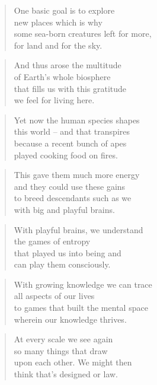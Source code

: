 \documentclass[10pt,a4paper]{article}
\begin{document}
\begin{multicols}{2}
\begin{verse}
One basic goal is to explore\\
new places which is why\\
some sea-born creatures left for more,\\
for land and for the sky.
\end{verse}

\begin{verse}
And thus arose the multitude\\
of Earth’s whole biosphere\\
that fills us with this gratitude\\
we feel for living here.
\end{verse}

\begin{verse}
Yet now the human species shapes\\
this world – and that transpires\\
because a recent bunch of apes\\
played cooking food on fires.
\end{verse}

\begin{verse}
This gave them much more energy\\
and they could use these gains\\
to breed descendants such as we\\
with big and playful brains.
\end{verse}

\begin{verse}
With playful brains, we understand\\
the games of entropy\\
that played us into being and\\
can play them consciously.
\end{verse}

\begin{verse}
With growing knowledge we can trace\\
all aspects of our lives\\
to games that built the mental space\\
wherein our knowledge thrives.
\end{verse}

\begin{verse}
At every scale we see again\\
so many things that draw\\
upon each other. We might then\\
think that’s designed or law.
\end{verse}


\end{multicols}
\end{document}

